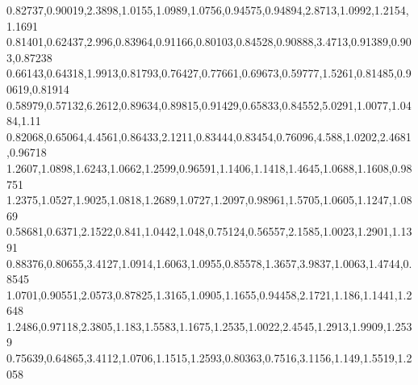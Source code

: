 0.82737,0.90019,2.3898,1.0155,1.0989,1.0756,0.94575,0.94894,2.8713,1.0992,1.2154,1.1691
0.81401,0.62437,2.996,0.83964,0.91166,0.80103,0.84528,0.90888,3.4713,0.91389,0.903,0.87238
0.66143,0.64318,1.9913,0.81793,0.76427,0.77661,0.69673,0.59777,1.5261,0.81485,0.90619,0.81914
0.58979,0.57132,6.2612,0.89634,0.89815,0.91429,0.65833,0.84552,5.0291,1.0077,1.0484,1.11
0.82068,0.65064,4.4561,0.86433,2.1211,0.83444,0.83454,0.76096,4.588,1.0202,2.4681,0.96718
1.2607,1.0898,1.6243,1.0662,1.2599,0.96591,1.1406,1.1418,1.4645,1.0688,1.1608,0.98751
1.2375,1.0527,1.9025,1.0818,1.2689,1.0727,1.2097,0.98961,1.5705,1.0605,1.1247,1.0869
0.58681,0.6371,2.1522,0.841,1.0442,1.048,0.75124,0.56557,2.1585,1.0023,1.2901,1.1391
0.88376,0.80655,3.4127,1.0914,1.6063,1.0955,0.85578,1.3657,3.9837,1.0063,1.4744,0.8545
1.0701,0.90551,2.0573,0.87825,1.3165,1.0905,1.1655,0.94458,2.1721,1.186,1.1441,1.2648
1.2486,0.97118,2.3805,1.183,1.5583,1.1675,1.2535,1.0022,2.4545,1.2913,1.9909,1.2539
0.75639,0.64865,3.4112,1.0706,1.1515,1.2593,0.80363,0.7516,3.1156,1.149,1.5519,1.2058
